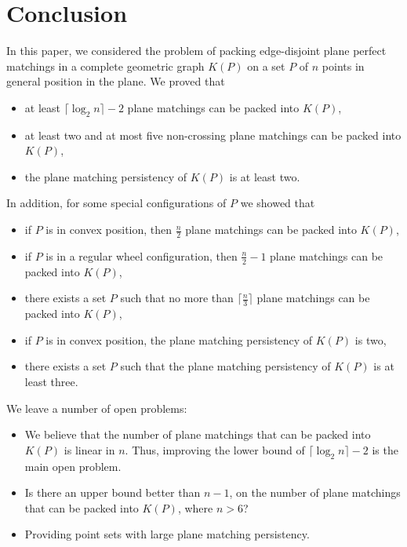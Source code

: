 \documentclass[11pt,a4paper]{article}
\newcommand{\Kn}[1]{K#1}
\begin{document}
\section{Conclusion}
\label{conclusion}
In this paper, we considered the problem of packing edge-disjoint plane perfect matchings in a complete geometric graph $\Kn{(P)}$ on a set $P$ of $n$ points in general position in the plane. We proved that
\begin{itemize}
  \item at least $\lceil\log_2{n}\rceil-2$ plane matchings can be packed into $\Kn{(P)}$,
  \item at least two and at most five non-crossing plane matchings can be packed into $\Kn{(P)}$,
  \item the plane matching persistency of $\Kn{(P)}$ is at least two.
\end{itemize}
In addition, for some special configurations of $P$ we showed that
\begin{itemize}
  \item if $P$ is in convex position, then $\frac{n}{2}$ plane matchings can be packed into $\Kn{(P)}$,
  \item if $P$ is in a regular wheel configuration, then $\frac{n}{2}-1$ plane matchings can be packed into $\Kn{(P)}$,
  \item there exists a set $P$ such that no more than $\lceil\frac{n}{3}\rceil$ plane matchings can be packed into $\Kn{(P)}$,
  \item if $P$ is in convex position, the plane matching persistency of $\Kn{(P)}$ is two,
  \item there exists a set $P$ such that the plane matching persistency of $\Kn{(P)}$ is at least three.
\end{itemize}

We leave a number of open problems:
\begin{itemize}
  \item We believe that the number of plane matchings that can be packed into $\Kn{(P)}$ is linear in $n$. Thus, improving the lower bound of $\lceil\log_2{n}\rceil-2$ is the main open problem.
  \item Is there an upper bound better than $n-1$, on the number of plane matchings that can be packed into $\Kn{(P)}$, where $n>6$?
  \item Providing point sets with large plane matching persistency.
\end{itemize}
 


\end{document}
